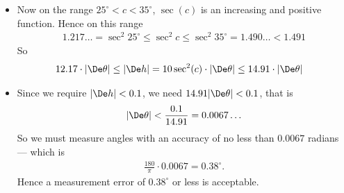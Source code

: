 \begin{eg}
\begin{itemize}
\item Now on the range $25^\circ < c < 35^\circ$, $\sec(c)$ is an increasing and
positive function. Hence on this range
\begin{align*}
  1.217\dots = \sec^2 25^\circ \leq \sec^2 c \leq \sec^2 35^\circ = 1.490\dots
< 1.491
\end{align*}
So
\begin{align*}
  12.17 \cdot |\De \theta| &\leq |\De h|
  = 10 \sec^2(c) \cdot |\De \theta| \leq 14.91 \cdot
  | \De \theta|
\end{align*}
\item Since we require $|\De h| < 0.1$, we need $14.91 |\De \theta| <0.1$, that
is
\begin{align*}
|\De \theta| < \frac{0.1}{14.91} = 0.0067\dots
\end{align*}
So we must measure angles with an accuracy of no less than $0.0067$ radians ---
which is
\begin{align*}
  \frac{180}{\pi} \cdot 0.0067 = 0.38^\circ.
\end{align*}
Hence a measurement error of $0.38^\circ$ or less is acceptable.

%
%
%

\end{itemize}
\end{eg}


